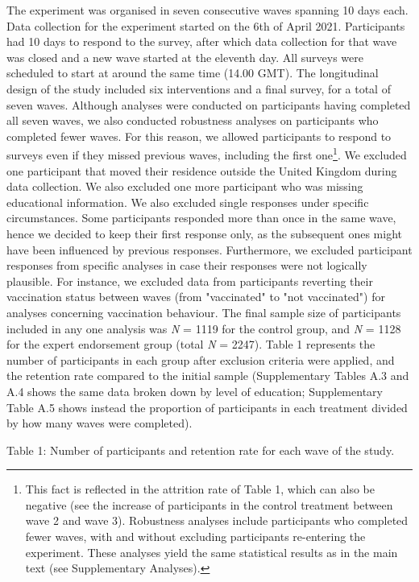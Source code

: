 \documentclass[authordate, empirical]{jote-new-article}
\begin{document}
	The experiment was organised in seven consecutive waves spanning 10 days each. Data collection for the experiment started on the 6th of April 2021. Participants had 10 days to respond to the survey, after which data collection for that wave was closed and a new wave started at the eleventh day. All surveys were scheduled to start at around the same time (14.00 GMT). The longitudinal design of the study included six interventions and a final survey, for a total of seven waves. Although analyses were conducted on participants having completed all seven waves, we also conducted robustness analyses on participants who completed fewer waves. For this reason, we allowed participants to respond to surveys even if they missed previous waves, including the first one\footnote{ This fact is reflected in the attrition rate of Table 1, which can also be negative (see the increase of participants in the control treatment between wave 2 and wave 3). Robustness analyses include participants who completed fewer waves, with and without excluding participants re-entering the experiment. These analyses yield the same statistical results as in the main text (see Supplementary Analyses).}. We excluded one participant that moved their residence outside the United Kingdom during data collection. We also excluded one more participant who was missing educational information. We also excluded single responses under specific circumstances. Some participants responded more than once in the same wave, hence we decided to keep their first response only, as the subsequent ones might have been influenced by previous responses. Furthermore, we excluded participant responses from specific analyses in case their responses were not logically plausible. For instance, we excluded data from participants reverting their vaccination status between waves (from "vaccinated" to "not vaccinated") for analyses concerning vaccination behaviour. The final sample size of participants included in any one analysis was \emph{N }= 1119 for the control group, and \emph{N }= 1128 for the expert endorsement group (total \emph{N }= 2247). Table 1 represents the number of participants in each group after exclusion criteria were applied, and the retention rate compared to the initial sample (Supplementary Tables A.3 and A.4 shows the same data broken down by level of education; Supplementary Table A.5 shows instead the proportion of participants in each treatment divided by how many waves were completed).



	Table 1: Number of participants and retention rate for each wave of the study.
\end{document}

